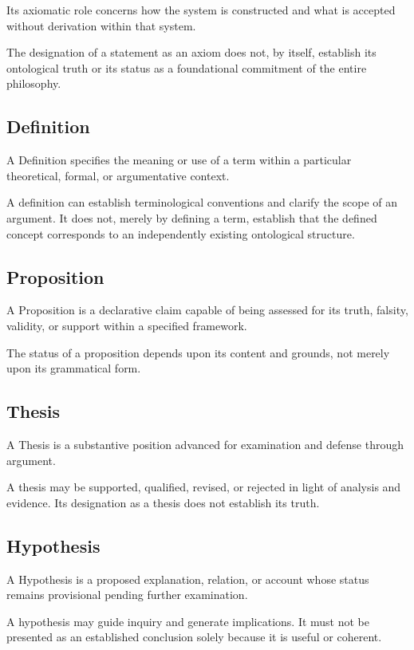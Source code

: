 Its axiomatic role concerns how the system is constructed and what
is accepted without derivation within that system.

The designation of a statement as an axiom does not, by itself,
establish its ontological truth or its status as a foundational
commitment of the entire philosophy.


\subsection*{Definition}

A Definition specifies the meaning or use of a term within a particular
theoretical, formal, or argumentative context.

A definition can establish terminological conventions and clarify
the scope of an argument. It does not, merely by defining a term,
establish that the defined concept corresponds to an independently
existing ontological structure.


\subsection*{Proposition}

A Proposition is a declarative claim capable of being assessed
for its truth, falsity, validity, or support within a specified
framework.

The status of a proposition depends upon its content and grounds,
not merely upon its grammatical form.


\subsection*{Thesis}

A Thesis is a substantive position advanced for examination and
defense through argument.

A thesis may be supported, qualified, revised, or rejected in light
of analysis and evidence. Its designation as a thesis does not
establish its truth.


\subsection*{Hypothesis}

A Hypothesis is a proposed explanation, relation, or account whose
status remains provisional pending further examination.

A hypothesis may guide inquiry and generate implications. It must
not be presented as an established conclusion solely because it
is useful or coherent.


